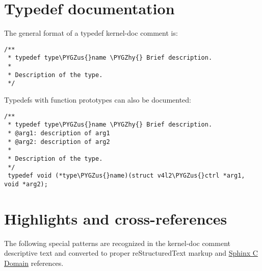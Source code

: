 \documentclass[a4paper,8pt,english]{sphinxmanual}
\def\PYGZus{\char`\_}
\def\PYGZhy{\char`\-}
\begin{document}
\section{Typedef documentation}
\label{doc-guide/kernel-doc:typedef-documentation}
The general format of a typedef kernel-doc comment is:

\begin{Verbatim}[commandchars=\\\{\}]
/**
 * typedef type\PYGZus{}name \PYGZhy{} Brief description.
 *
 * Description of the type.
 */
\end{Verbatim}

Typedefs with function prototypes can also be documented:

\begin{Verbatim}[commandchars=\\\{\}]
/**
 * typedef type\PYGZus{}name \PYGZhy{} Brief description.
 * @arg1: description of arg1
 * @arg2: description of arg2
 *
 * Description of the type.
 */
 typedef void (*type\PYGZus{}name)(struct v4l2\PYGZus{}ctrl *arg1, void *arg2);
\end{Verbatim}


\section{Highlights and cross-references}
\label{doc-guide/kernel-doc:highlights-and-cross-references}
The following special patterns are recognized in the kernel-doc comment
descriptive text and converted to proper reStructuredText markup and \href{http://www.sphinx-doc.org/en/stable/domains.html}{Sphinx C
Domain} references.
\end{document}
